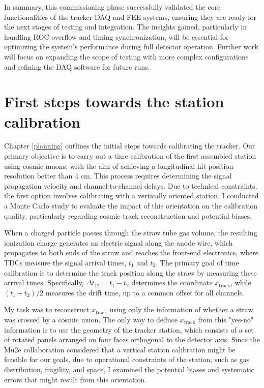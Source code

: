 In summary, this commissioning phase successfully validated the core functionalities 
of the tracker DAQ and FEE systems, ensuring they are ready for the next stages of 
testing and integration. The insights gained, particularly in handling ROC overflow 
and timing synchronization, will be essential for optimizing the system's performance 
during full detector operation. Further work will focus on expanding the scope of 
testing with more complex configurations and refining the DAQ software for future runs.


\section{First steps towards the station calibration}
Chapter \ref{planning} outlines the initial steps towards calibrating the 
tracker. Our primary objective is to carry out a time calibration of 
the first assembled station using cosmic muons, with the aim of achieving 
a longitudinal hit position resolution better than 4 cm. This process 
requires determining the signal propagation velocity and channel-to-channel delays. 
Due to technical constraints, the first option involves calibrating with a 
vertically oriented station. I conducted a Monte Carlo study to evaluate the 
impact of this orientation on the calibration quality, particularly regarding 
cosmic track reconstruction and potential biases.

When a charged particle passes through the straw tube gas volume, the 
resulting ionization charge generates an electric signal along the anode wire, 
which propagates to both ends of the straw and reaches the front-end electronics, 
where TDCs measure the signal arrival times, $t_1$ and $t_2$. The primary 
goal of time calibration is to determine the track position along the straw 
by measuring these arrival times. Specifically, $\Delta t_{12} = t_1 - t_2$ determines 
the coordinate $x_{\text{track}}$, while $(t_1 + t_2)/2$ measures the drift time, 
up to a common offset for all channels.

My task was to reconstruct $x_{\text{track}}$ using only the information of 
whether a straw was crossed by a cosmic muon. The only way to deduce $x_{\text{track}}$ 
from this "yes-no" information is to use the geometry of the tracker station, 
which consists of a set of rotated panels arranged on four faces orthogonal 
to the detector axis. Since the Mu2e collaboration considered that a vertical station 
calibration might be feasible for our goals, due to operational constraints of the 
station, such as gas distribution, fragility, and space, I examined the potential 
biases and systematic errors that might result from this orientation.

